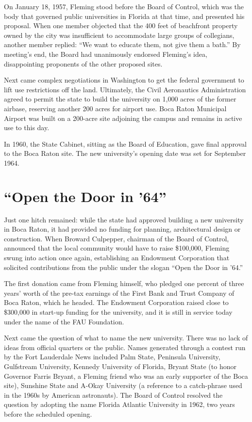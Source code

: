 \documentclass{article}
\begin{document}
On January 18, 1957, Fleming stood before the Board of Control, which was the body that governed public universities in Florida at that time, and presented his proposal.  When one member objected that the 400 feet of beachfront property owned by the city was insufficient to accommodate large groups of collegians, another member replied: ``We want to educate them, not give them a bath.''  By meeting's end, the Board had unanimously endorsed Fleming's idea, disappointing proponents of the other proposed sites.

Next came complex negotiations in Washington to get the federal government to lift use restrictions off the land.  Ultimately, the Civil Aeronautics Administration agreed to permit the state to build the university on 1,000 acres of the former airbase, reserving another 200 acres for airport use.  Boca Raton Municipal Airport was built on a 200-acre site adjoining the campus and remains in active use to this day.

In 1960, the State Cabinet, sitting as the Board of Education, gave final approval to the Boca Raton site.  The new university's opening date was set for September 1964.

\section{``Open the Door in '64''}

Just one hitch remained: while the state had approved building a new university in Boca Raton, it had provided no funding for planning, architectural design or construction.  When Broward Culpepper, chairman of the Board of Control, announced that the local community would have to raise \$100,000, Fleming swung into action once again, establishing an Endowment Corporation that solicited contributions from the public under the slogan ``Open the Door in '64.''

The first donation came from Fleming himself, who pledged one percent of three years' worth of the pre-tax earnings of the First Bank and Trust Company of Boca Raton, which he headed.  The Endowment Corporation raised close to \$300,000 in start-up funding for the university, and it is still in service today under the name of the FAU Foundation.

Next came the question of what to name the new university.  There was no lack of ideas from official quarters or the public.  Names generated through a contest run by the Fort Lauderdale News included Palm State, Peninsula University, Gulfstream University, Kennedy University of Florida, Bryant State (to honor Governor Farris Bryant, a Fleming friend who was an early supporter of the Boca site), Sunshine State and A-Okay University (a reference to a catch-phrase used in the 1960s by American astronauts).  The Board of Control resolved the question by adopting the name Florida Atlantic University in 1962, two years before the scheduled opening.
\end{document}
